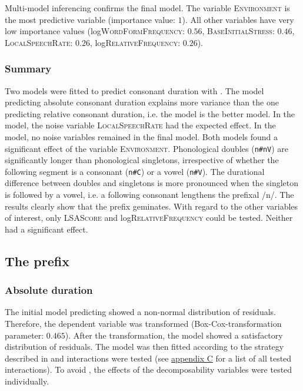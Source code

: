 Multi-model inferencing confirms the final model. The variable \textsc{Environment} is the most predictive variable (importance value: $1$). All other variables have very low importance values  (log\textsc{WordFormFrequency}: $0.56$, \textsc{BaseInitialStress}: $0.46$, \textsc{LocalSpeechRate}: $0.26$, log\textsc{RelativeFrequency}: $0.26$).


\subsubsection{Summary}

Two models were fitted to predict consonant duration with  . The model predicting absolute consonant duration explains more variance than the one predicting relative consonant duration, i.e. the  model is the better model. In the  model, the noise variable \textsc{LocalSpeechRate} had the expected effect. In the  model, no noise variables remained in the final model.
 Both models found a significant effect of the variable \textsc{Environment}. Phonological doubles (\texttt{n\#nV}) are significantly longer than phonological singletons, irrespective of whether the following segment is a consonant (\texttt{n\#C}) or a vowel (\texttt{n\#V}). The durational difference between doubles and singletons is more pronounced when the singleton is followed by a vowel, i.e. a following consonant lengthens the prefixal /n/. The results clearly show that the prefix  geminates.
With regard to the other variables of interest, only \textsc{LSAScore} and log\textsc{RelativeFrequency} could be tested. Neither had a significant effect. 


\subsection{The prefix } \label{in corpus}


\subsubsection{Absolute duration}

The initial model predicting  showed a non-normal distribution of residuals. Therefore, the dependent variable was  transformed (Box-Cox-transformation  parameter: $0.465$). After the transformation, the model showed a satisfactory distribution of residuals. The model was then fitted according to the strategy described in  and interactions were tested (see \hyperref[Appendix C: Summaries of tested interactions in corpus study]{appendix C} for a list of all tested interactions). 
To avoid , the effects of the decomposability variables were tested individually.


